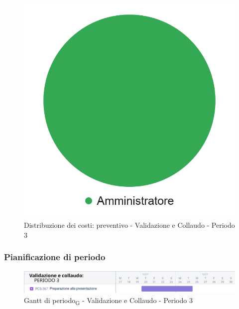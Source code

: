 \hspace{-1cm}
\begin{minipage}{.50\textwidth}
\smallPreventivoTable{
	
}
\end{minipage}
\hspace{1cm}
\begin{minipage}{.40\textwidth}
\begin{figure}[H]
	\includegraphics[scale=0.21]{res/images/charts/preventivo_priori/Grafico4-11.png}
	\caption{Distribuzione dei costi: preventivo - Validazione e Collaudo - Periodo 3}
\end{figure}
\end{minipage} 


\subsubsection{Pianificazione di periodo}


\begin{figure}[H]
	\centering
	\includegraphics[scale=0.55]{res/images/gantt_periodo/valid_3_gantt.png}
	\caption{Gantt di periodo\textsubscript{G} - Validazione e Collaudo - Periodo 3}
\end{figure}

